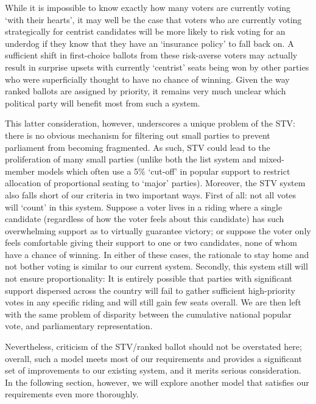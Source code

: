 \documentclass[DIV=calc, paper=a4, fontsize=11pt, twocolumn]{scrartcl}	 %
\begin{document}
While it is impossible to know exactly how many voters are currently voting `with their hearts', it may well be the case that voters who are currently voting strategically for centrist candidates will be more likely to risk voting for an underdog if they know that they have an `insurance policy' to fall back on. 
A sufficient shift in first-choice ballots from these risk-averse voters may actually result in surprise upsets with currently `centrist' seats being won by other parties who were superficially thought to have no chance of winning. Given the way ranked ballots are assigned by priority, it remains very much unclear which political party will benefit most from such a system. 

This latter consideration, however, underscores a unique problem of the STV:  there is no obvious mechanism for filtering out small parties to prevent parliament from becoming fragmented. As such, STV could lead to the proliferation of many small parties
(unlike both the list system and  mixed-member models which often use a 5\% `cut-off' in popular support to restrict allocation of proportional seating to `major' parties). 
Moreover, the STV system also falls short of our criteria in two important ways.
First of all: not all votes will `count' in this system. Suppose a voter lives in a riding where a single candidate (regardless of how the voter feels about this candidate) has such overwhelming support as to virtually guarantee victory; or suppose the voter only feels comfortable giving their support to one or two candidates, none of whom have a chance of winning. In either of these cases, the rationale to stay home and not bother voting is similar to our current system. 
Secondly, this system still will not ensure proportionality: It is entirely possible that parties with significant support dispersed across the country will fail to gather sufficient high-priority votes in any specific riding and will still gain few seats overall.  
We are then left with the same problem of disparity between the cumulative national popular vote, and parliamentary representation.

Nevertheless, criticism of the STV/ranked ballot should not be overstated here; overall, such a model meets most of our requirements and provides a significant set of improvements to our existing system, and it merits serious consideration. In the following section, however, we will explore another model that satisfies our requirements even more thoroughly.


\end{document}
